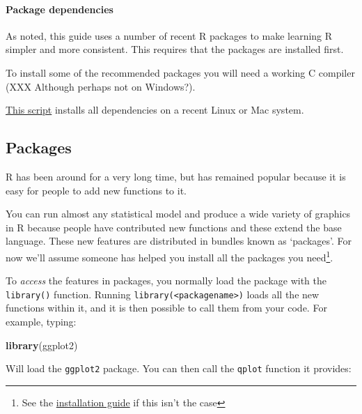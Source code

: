 \documentclass[]{article}
\newenvironment{Shaded}{\begin{snugshade}}{\end{snugshade}}
\newcommand{\KeywordTok}[1]{\textcolor[rgb]{0.13,0.29,0.53}{\textbf{#1}}}
\newcommand{\DataTypeTok}[1]{\textcolor[rgb]{0.13,0.29,0.53}{#1}}
\newcommand{\DecValTok}[1]{\textcolor[rgb]{0.00,0.00,0.81}{#1}}
\newcommand{\OperatorTok}[1]{\textcolor[rgb]{0.81,0.36,0.00}{\textbf{#1}}}
\newcommand{\NormalTok}[1]{#1}
\let\oldparagraph\paragraph
\renewcommand{\paragraph}[1]{\oldparagraph{#1}\mbox{}}
\let\rmarkdownfootnote\footnote%
\def\footnote{\protect\rmarkdownfootnote}
\theoremstyle{definition}
\theoremstyle{definition}
\theoremstyle{definition}
\theoremstyle{remark}
\begin{document}
\hypertarget{dependencies}{\paragraph{Package
dependencies}\label{dependencies}}

As noted, this guide uses a number of recent R packages to make learning
R simpler and more consistent. This requires that the packages are
installed first.

To install some of the recommended packages you will need a working C
compiler (XXX Although perhaps not on Windows?).

\href{requirements.R}{This script} installs all dependencies on a recent
Linux or Mac system.

\hypertarget{packages}{\subsection*{Packages}\label{packages}}

R has been around for a very long time, but has remained popular because
it is easy for people to add new functions to it.

You can run almost any statistical model and produce a wide variety of
graphics in R because people have contributed new functions and these
extend the base language. These new features are distributed in bundles
known as `packages'. For now we'll assume someone has helped you install
all the packages you need\footnote{See the
  \href{installation.html}{installation guide} if this isn't the case}.

To \emph{access} the features in packages, you normally load the package
with the \texttt{library()} function. Running
\texttt{library(\textless{}packagename\textgreater{})} loads all the new
functions within it, and it is then possible to call them from your
code. For example, typing:

\begin{Shaded}
\begin{Highlighting}[]
\KeywordTok{library}\NormalTok{(ggplot2)}
\end{Highlighting}
\end{Shaded}

Will load the \texttt{ggplot2} package. You can then call the
\texttt{qplot} function it provides:

\begin{Shaded}
\end{Shaded}
\end{document}
